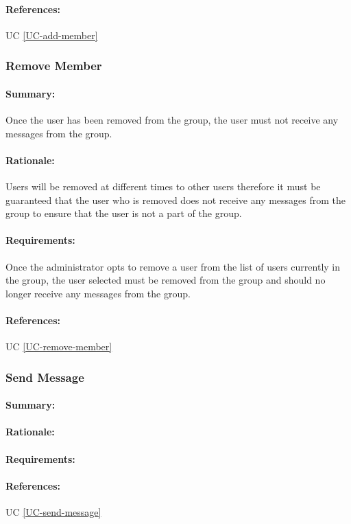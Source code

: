 \documentclass[11pt]{article}
\begin{document}
\paragraph{References:} UC \ref{UC-add-member}
\subsubsection{Remove Member} \label{FR-remove-member}
\paragraph{Summary:}
Once the user has been removed from the group, the user must not receive any messages from the group.
\paragraph{Rationale:}
Users will be removed at different times to other users therefore it must be guaranteed that the user who is removed does not receive any messages from the group to ensure that the user is not a part of the group.
\paragraph{Requirements:}
Once the administrator opts to remove a user from the list of users currently in the group, the user selected must be removed from the group and should no longer receive any messages from the group.
\paragraph{References:} UC \ref{UC-remove-member}
\subsubsection{Send Message} \label{FR-send-message}
\paragraph{Summary:}
\paragraph{Rationale:}
\paragraph{Requirements:}
\paragraph{References:} UC \ref{UC-send-message}
\end{document}
